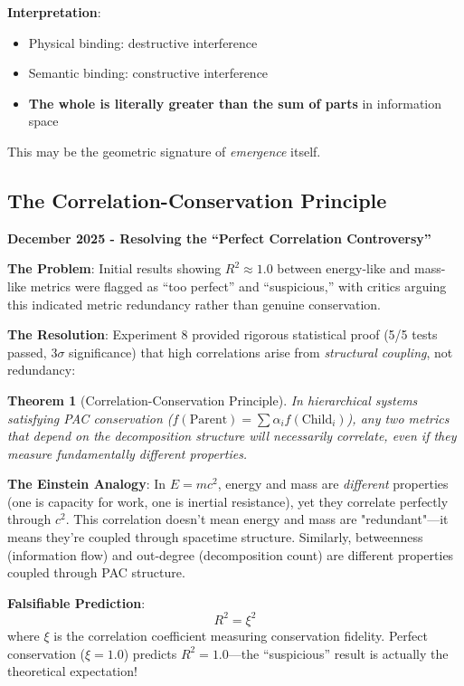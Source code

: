 \documentclass[11pt,a4paper]{article}
\newtheorem{theorem}{Theorem}
\begin{document}
\textbf{Interpretation}: 
\begin{itemize}
    \item Physical binding: destructive interference
    \item Semantic binding: constructive interference
    \item \textbf{The whole is literally greater than the sum of parts} in information space
\end{itemize}

This may be the geometric signature of \emph{emergence} itself.

\subsection{The Correlation-Conservation Principle}

\textbf{December 2025 - Resolving the ``Perfect Correlation Controversy''}

\textbf{The Problem}: Initial results showing $R^2 \approx 1.0$ between energy-like and mass-like metrics were flagged as ``too perfect'' and ``suspicious,'' with critics arguing this indicated metric redundancy rather than genuine conservation.

\textbf{The Resolution}: Experiment 8 provided rigorous statistical proof (5/5 tests passed, $3\sigma$ significance) that high correlations arise from \emph{structural coupling}, not redundancy:

\begin{theorem}[Correlation-Conservation Principle]
In hierarchical systems satisfying PAC conservation ($f(\text{Parent}) = \sum \alpha_i f(\text{Child}_i)$), any two metrics that depend on the decomposition structure will necessarily correlate, even if they measure fundamentally different properties.
\end{theorem}

\textbf{The Einstein Analogy}: In $E=mc^2$, energy and mass are \emph{different} properties (one is capacity for work, one is inertial resistance), yet they correlate perfectly through $c^2$. This correlation doesn't mean energy and mass are "redundant"---it means they're coupled through spacetime structure. Similarly, betweenness (information flow) and out-degree (decomposition count) are different properties coupled through PAC structure.

\textbf{Falsifiable Prediction}: 
\begin{equation}
R^2 = \xi^2
\end{equation}
where $\xi$ is the correlation coefficient measuring conservation fidelity. Perfect conservation ($\xi = 1.0$) predicts $R^2 = 1.0$---the ``suspicious'' result is actually the theoretical expectation!
\end{document}
